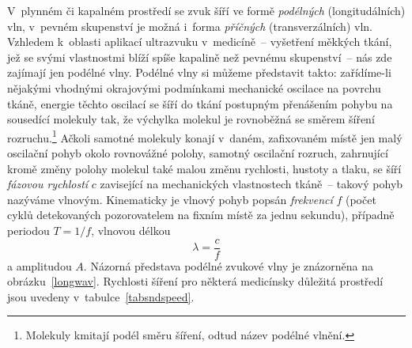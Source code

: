 V~plynném či kapalném prostředí se zvuk šíří ve formě \emph{podélných}
(longitudálních) vln, v~pevném skupenství je možná i~forma \emph{příčných}
(transverzálních) vln. Vzhledem k~oblasti aplikací ultrazvuku v~medicíně~--
vyšetření měkkých tkání, jež se svými vlastnostmi blíží spíše kapalině než
pevnému skupenství~-- nás zde zajímají jen podélné vlny. Podélné vlny si
můžeme představit takto: zařídíme-li nějakými vhodnými okrajovými podmínkami
mechanické oscilace na povrchu tkáně, energie těchto oscilací se šíří do tkání
postupným přenášením pohybu na sousedící molekuly tak, že výchylka molekul je
rovnoběžná se směrem šíření rozruchu.\footnote{Molekuly kmitají podél směru
  šíření, odtud název podélné vlnění.} Ačkoli samotné molekuly konají v~daném,
zafixovaném místě jen malý oscilační pohyb okolo rovnovážné polohy, samotný
oscilační rozruch, zahrnující kromě změny polohy molekul také malou změnu
rychlosti, hustoty a tlaku, se šíří \emph{fázovou rychlostí} $c$ zavisející na
mechanických vlastnostech tkáně~-- takový pohyb nazýváme vlnovým. Kinematicky
je vlnový pohyb popsán \emph{frekvencí} $f$ (počet cyklů detekovaných
pozorovatelem na fixním místě za jednu sekundu), případně periodou $T=1/f$,
vlnovou délkou
\begin{equation}
  \lambda = \frac{c}{f}                                     \label{sonwlen}
\end{equation}
a amplitudou $A$.  Názorná představa podélné zvukové vlny je znázorněna na
obrázku~\ref{longwav}. Rychlosti šíření pro některá medicínsky důležitá
prostředí jsou uvedeny v~tabulce~\ref{tabsndspeed}.

